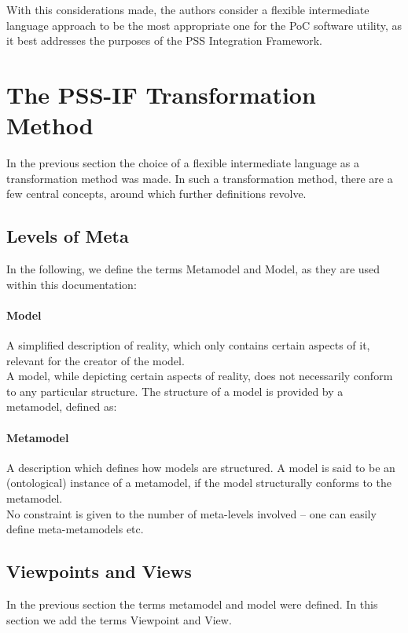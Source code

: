 With this considerations made, the authors consider a flexible intermediate language approach to be the most appropriate one for the PoC software utility, as it best addresses the purposes of the PSS Integration Framework.

\section{The PSS-IF Transformation Method}
\label{sec:approach:pssif}

In the previous section the choice of a flexible intermediate language as a transformation method was made. In such a transformation method, there are a few central concepts, around which further definitions revolve.

\subsection{Levels of Meta}

In the following, we define the terms Metamodel and Model, as they are used within this documentation:

\paragraph{Model} A simplified description of reality, which only contains certain aspects of it, relevant for the creator of the model.\\

A model, while depicting certain aspects of reality, does not necessarily conform to any particular structure. The structure of a model is provided by a metamodel, defined as:

\paragraph{Metamodel} A description which defines how models are structured. A model is said to be an (ontological) instance of a metamodel, if the model structurally conforms to the metamodel.\\

No constraint is given to the number of meta-levels involved -- one can easily define meta-metamodels etc.

\subsection{Viewpoints and Views}

In the previous section the terms metamodel and model were defined. In this section we add the terms Viewpoint and View.

